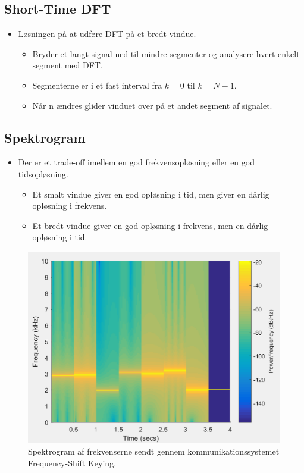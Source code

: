 \documentclass[danish]{article}
\begin{document}
\subsection{Short-Time DFT} 
\begin{itemize}
	\item Løsningen på at udføre DFT på et bredt vindue.
­	\begin{itemize}
	\item Bryder et langt signal ned til mindre segmenter og analysere hvert enkelt segment med DFT.
­	\item Segmenterne er i et fast interval fra $k = 0$ til $k = N-1$.
­	\item Når n ændres glider vinduet over på et andet segment af signalet. 
\end{itemize}
\end{itemize}

\subsection{Spektrogram}
\begin{itemize}
	\item Der er et trade-off imellem en god frekvensopløsning eller en god tidsopløsning. 
­	\begin{itemize}
		\item Et smalt vindue giver en god opløsning i tid, men giver en dårlig opløsning i frekvens. 
­		\item Et bredt vindue giver en god opløsning i frekvens, men en dårlig opløsning i tid. 
	\end{itemize}
\end{itemize}

\begin{figure}[H]
	\centering
	\includegraphics[width=0.6\linewidth]{graphics/spectrogram}
	\caption{Spektrogram af frekvenserne sendt gennem kommunikationssystemet Frequency-Shift Keying.}
	\label{fig:spectrogram}
\end{figure}
\end{document}

